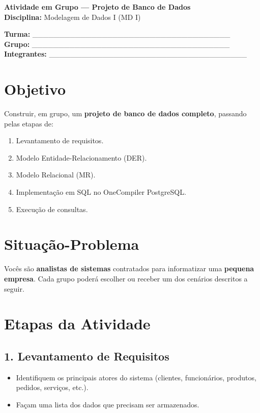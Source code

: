 \documentclass[12pt,a4paper]{article}
\begin{document}
\begin{center}
    \Large \textbf{Atividade em Grupo — Projeto de Banco de Dados} \\[0.5cm]
    \normalsize \textbf{Disciplina:} Modelagem de Dados I (MD I) \\[0.2cm]
\end{center}

\vspace{0.5cm}

\noindent \textbf{Turma:} \_\_\_\_\_\_\_\_\_\_\_\_\_\_\_\_\_\_\_\_\_\_\_\_\_\_\_\_\_\_\_\_\_\_\_\_\_ \\
\textbf{Grupo:} \_\_\_\_\_\_\_\_\_\_\_\_\_\_\_\_\_\_\_\_\_\_\_\_\_\_\_\_\_\_\_\_\_\_\_\_\_ \\
\textbf{Integrantes:} \_\_\_\_\_\_\_\_\_\_\_\_\_\_\_\_\_\_\_\_\_\_\_\_\_\_\_\_\_\_\_\_\_\_\_\_\_

\vspace{0.5cm}

\section*{Objetivo}
Construir, em grupo, um \textbf{projeto de banco de dados completo}, passando pelas etapas de:
\begin{enumerate}
    \item Levantamento de requisitos.
    \item Modelo Entidade-Relacionamento (DER).
    \item Modelo Relacional (MR).
    \item Implementação em SQL no OneCompiler PostgreSQL.
    \item Execução de consultas.
\end{enumerate}

\section*{Situação-Problema}
Vocês são \textbf{analistas de sistemas} contratados para informatizar uma \textbf{pequena empresa}.  
Cada grupo poderá escolher ou receber um dos cenários descritos a seguir.  

\section*{Etapas da Atividade}

\subsection*{1. Levantamento de Requisitos}
\begin{itemize}
    \item Identifiquem os principais atores do sistema (clientes, funcionários, produtos, pedidos, serviços, etc.).
    \item Façam uma lista dos dados que precisam ser armazenados.
\end{itemize}
\end{document}
